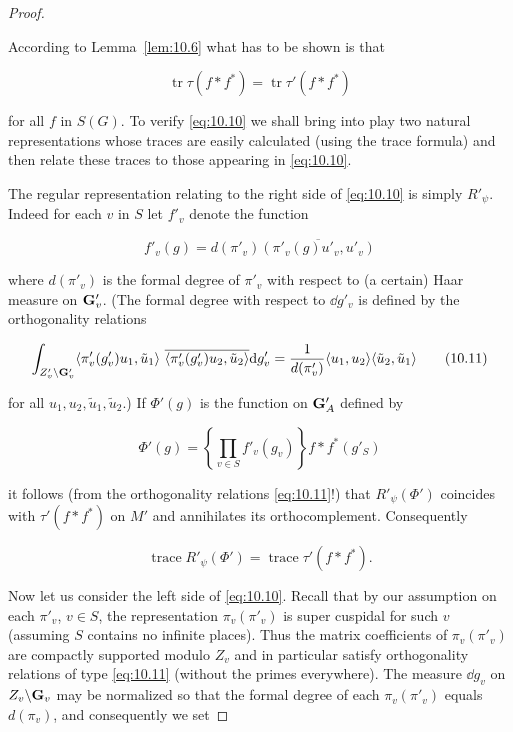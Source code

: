 \begin{proof}
\begin{enumerate}[(i)]
\end{enumerate}

According to Lemma~\ref{lem:10.6} what has to be shown is that

\begin{equation}\label{eq:10.10}
\operatorname{tr} \tau(f * f^*) = \operatorname{tr} \tau'(f * f^*)\tag{10.10}
\end{equation}

for all $f$ in $S(G)$. To verify \eqref{eq:10.10} we shall bring into play two natural representations whose traces are easily calculated (using the trace formula) and then relate these traces to those appearing in \eqref{eq:10.10}.

The regular representation relating to the right side of \eqref{eq:10.10} is simply $R'_\psi$. Indeed for each $v$ in $S$ let $f'_v$ denote the function

\[
f'_v(g) = d(\pi'_v)\overline{(\pi'_v(g)u'_v, u'_v)}
\]

where $d(\pi'_v)$ is the formal degree of $\pi'_v$ with respect to (a certain) Haar measure on $\mathbf{G}'_v$. (The formal degree with respect to $\dd g'_v$ is defined by the orthogonality relations

\begin{equation}\label{eq:10.11}
\int_{Z'_v \backslash \mathbf{G}'_v} \langle\pi'_v(g'_v)u_1, \tilde{u}_1\rangle\ \overline{\langle\pi'_v(g'_v)u_2, \tilde{u}_2\rangle} \mathrm{d} g'_v = \frac{1}{d(\pi'_v)}\langle u_1, u_2\rangle\langle\tilde{u}_2, \tilde{u}_1\rangle\tag{10.11}
\end{equation}

for all $u_1, u_2, \tilde{u}_1, \tilde{u}_2$.) If $\Phi'(g)$ is the function on $\mathbf{G}'_A$ defined by

\[
\Phi'(g) = \left\{\prod_{v \in S} f'_v(g_v)\right\} f * f^*(g'_S)
\]

it follows (from the orthogonality relations \eqref{eq:10.11}!) that $R'_\psi(\Phi')$ coincides with $\tau'(f * f^*)$ on $M'$ and annihilates its orthocomplement. Consequently

\begin{equation}\label{eq:10.12}
\operatorname{trace} R'_\psi(\Phi') = \operatorname{trace} \tau'(f * f^*).\tag{10.12}
\end{equation}

Now let us consider the left side of \eqref{eq:10.10}. Recall that by our assumption on each $\pi'_v$, $v \in S$, the representation $\pi_v(\pi'_v)$ is super cuspidal for such $v$ (assuming $S$ contains no infinite places). Thus the matrix coefficients of $\pi_v(\pi'_v)$ are compactly supported modulo $Z_v$ and in particular satisfy orthogonality relations of type \eqref{eq:10.11} (without the primes everywhere). The measure $\dd g_v$ on $Z_v \backslash \mathbf{G}_v$ may be normalized so that the formal degree of each $\pi_v(\pi'_v)$ equals $d(\pi_v)$, and consequently we set


\end{proof}
